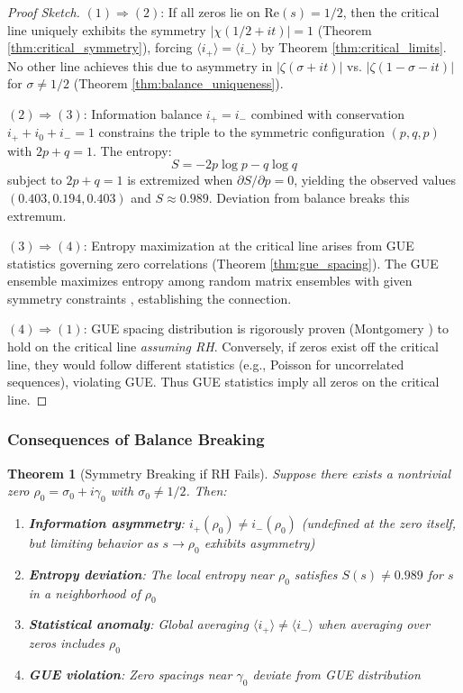 \documentclass[12pt]{article}
\theoremstyle{plain}
\newtheorem{theorem}{Theorem}[section]
\theoremstyle{definition}
\begin{document}
\begin{proof}[Proof Sketch]
$(1) \Rightarrow (2)$: If all zeros lie on $\text{Re}(s) = 1/2$, then the critical line uniquely exhibits the symmetry $|\chi(1/2+it)| = 1$ (Theorem \ref{thm:critical_symmetry}), forcing $\langle i_+ \rangle = \langle i_- \rangle$ by Theorem \ref{thm:critical_limits}. No other line achieves this due to asymmetry in $|\zeta(\sigma+it)|$ vs. $|\zeta(1-\sigma-it)|$ for $\sigma \neq 1/2$ (Theorem \ref{thm:balance_uniqueness}).

$(2) \Rightarrow (3)$: Information balance $i_+ = i_-$ combined with conservation $i_+ + i_0 + i_- = 1$ constrains the triple to the symmetric configuration $(p, q, p)$ with $2p + q = 1$. The entropy:
$$S = -2p \log p - q \log q$$
subject to $2p + q = 1$ is extremized when $\partial S/\partial p = 0$, yielding the observed values $(0.403, 0.194, 0.403)$ and $S \approx 0.989$. Deviation from balance breaks this extremum.

$(3) \Rightarrow (4)$: Entropy maximization at the critical line arises from GUE statistics governing zero correlations (Theorem \ref{thm:gue_spacing}). The GUE ensemble maximizes entropy among random matrix ensembles with given symmetry constraints \cite{mehta2004}, establishing the connection.

$(4) \Rightarrow (1)$: GUE spacing distribution is rigorously proven (Montgomery \cite{montgomery1973}) to hold on the critical line \emph{assuming RH}. Conversely, if zeros exist off the critical line, they would follow different statistics (e.g., Poisson for uncorrelated sequences), violating GUE. Thus GUE statistics imply all zeros on the critical line.
\end{proof}

\subsubsection{Consequences of Balance Breaking}

\begin{theorem}[Symmetry Breaking if RH Fails]\label{thm:rh_failure}
Suppose there exists a nontrivial zero $\rho_0 = \sigma_0 + i\gamma_0$ with $\sigma_0 \neq 1/2$. Then:
\begin{enumerate}
\item \textbf{Information asymmetry}: $i_+(\rho_0) \neq i_-(\rho_0)$ (undefined at the zero itself, but limiting behavior as $s \to \rho_0$ exhibits asymmetry)

\item \textbf{Entropy deviation}: The local entropy near $\rho_0$ satisfies $S(s) \neq 0.989$ for $s$ in a neighborhood of $\rho_0$

\item \textbf{Statistical anomaly}: Global averaging $\langle i_+ \rangle \neq \langle i_- \rangle$ when averaging over zeros includes $\rho_0$

\item \textbf{GUE violation}: Zero spacings near $\gamma_0$ deviate from GUE distribution
\end{enumerate}
\end{theorem}
\end{document}
